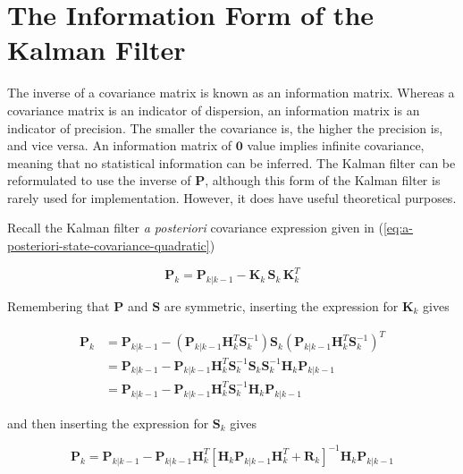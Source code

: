 \section{The Information Form of the Kalman Filter}
\label{The Information Form of the Kalman Filter}

The inverse of a covariance matrix is known as an information matrix. Whereas a
covariance matrix is an indicator of dispersion, an information matrix is an indicator
of precision. The smaller the covariance is, the higher the precision is, and vice versa.
An information matrix of $\mathbf{0}$ value implies infinite covariance, meaning that no
statistical information can be inferred. The Kalman filter can be reformulated to use the
inverse of $\mathbf{P}$, although this form of the Kalman filter is rarely used for
implementation. However, it does have useful theoretical purposes.

Recall the Kalman filter \textit{a posteriori} covariance expression given in
(\ref{eq:a-posteriori-state-covariance-quadratic})

\begin{equation*}
    \mathbf{P}_k = \mathbf{P}_{k|k-1} - \mathbf{K}_{k} \, \mathbf{S}_{k} \, \mathbf{K}_{k}^T
\end{equation*}

Remembering that $\mathbf{P}$ and $\mathbf{S}$ are symmetric, inserting the expression
for $\mathbf{K}_k$ gives

\begin{equation*}
    \begin{aligned}
        \mathbf{P}_k
        &= \mathbf{P}_{k|k-1} - \left( \mathbf{P}_{k|k-1} \mathbf{H}_k^T \mathbf{S}_k^{-1} \right) \mathbf{S}_{k} \left( \mathbf{P}_{k|k-1} \mathbf{H}_k^T \mathbf{S}_k^{-1} \right)^T \\
        &= \mathbf{P}_{k|k-1} - \mathbf{P}_{k|k-1} \mathbf{H}_k^T \mathbf{S}_k^{-1} \mathbf{S}_{k} \mathbf{S}_k^{-1} \mathbf{H}_k \mathbf{P}_{k|k-1} \\
        &= \mathbf{P}_{k|k-1} - \mathbf{P}_{k|k-1} \mathbf{H}_k^T \mathbf{S}_k^{-1} \mathbf{H}_k \mathbf{P}_{k|k-1}
    \end{aligned}
\end{equation*}

and then inserting the expression for $\mathbf{S}_k$ gives

\begin{equation}
    \mathbf{P}_k = \mathbf{P}_{k|k-1} - \mathbf{P}_{k|k-1} \mathbf{H}_k^T \left[ \mathbf{H}_k \mathbf{P}_{k|k-1} \mathbf{H}_k^T + \mathbf{R}_k \right]^{-1} \mathbf{H}_k \mathbf{P}_{k|k-1}
    \label{eq:state-covariance-quadratic-expanded}
\end{equation}


